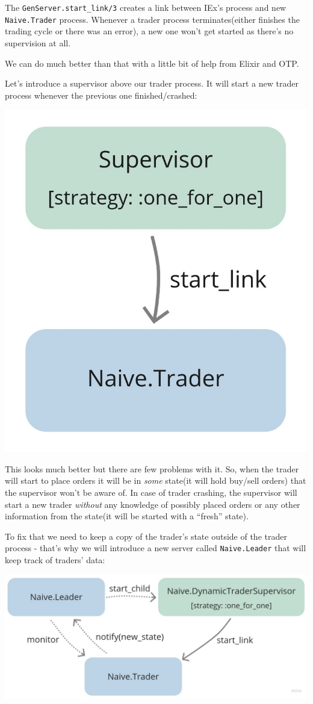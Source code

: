 \documentclass[
  oneside]{book}
\begin{document}
The \texttt{GenServer.start\_link/3} creates a link between IEx's process and new \texttt{Naive.Trader} process. Whenever a trader process terminates(either finishes the trading cycle or there was an error), a new one won't get started as there's no supervision at all.

We can do much better than that with a little bit of help from Elixir and OTP.

\newpage

Let's introduce a supervisor above our trader process. It will start a new trader process whenever the previous one finished/crashed:

\begin{center}\includegraphics[width=0.25\linewidth]{images/chapter_05_02_supervise_the_trader} \end{center}

This looks much better but there are few problems with it. So, when the trader will start to place orders it will be in \emph{some} state(it will hold buy/sell orders) that the supervisor won't be aware of. In case of trader crashing, the supervisor will start a new trader \emph{without} any knowledge of possibly placed orders or any other information from the state(it will be started with a ``fresh'' state).

To fix that we need to keep a copy of the trader's state outside of the trader process - that's why we will introduce a new server called \texttt{Naive.Leader} that will keep track of traders' data:

\begin{center}\includegraphics[width=0.7\linewidth]{images/chapter_05_03_leader_added} \end{center}
\end{document}
